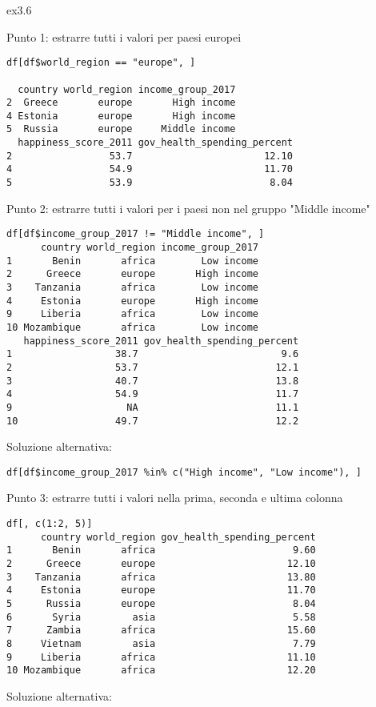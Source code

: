 \begin{solution}{ex3.6}

\noindent Punto 1: estrarre tutti i valori per paesi europei

\begin{lstlisting}[style=Rstyle]
df[df$world_region == "europe", ]

  country world_region income_group_2017
2  Greece       europe       High income
4 Estonia       europe       High income
5  Russia       europe     Middle income
  happiness_score_2011 gov_health_spending_percent
2                 53.7                       12.10
4                 54.9                       11.70
5                 53.9                        8.04
\end{lstlisting}
%
\noindent Punto 2: estrarre tutti i valori per i paesi non nel gruppo "Middle income"

\begin{lstlisting}[style=Rstyle]
df[df$income_group_2017 != "Middle income", ]
      country world_region income_group_2017
1       Benin       africa        Low income
2      Greece       europe       High income
3    Tanzania       africa        Low income
4     Estonia       europe       High income
9     Liberia       africa        Low income
10 Mozambique       africa        Low income
   happiness_score_2011 gov_health_spending_percent
1                  38.7                         9.6
2                  53.7                        12.1
3                  40.7                        13.8
4                  54.9                        11.7
9                    NA                        11.1
10                 49.7                        12.2
\end{lstlisting}
%
Soluzione alternativa:

\begin{lstlisting}[style=Rstyle]
df[df$income_group_2017 %in% c("High income", "Low income"), ]
\end{lstlisting}
%
\noindent Punto 3: estrarre tutti i valori nella prima, seconda e ultima colonna

\begin{lstlisting}[style=Rstyle]
df[, c(1:2, 5)]
      country world_region gov_health_spending_percent
1       Benin       africa                        9.60
2      Greece       europe                       12.10
3    Tanzania       africa                       13.80
4     Estonia       europe                       11.70
5      Russia       europe                        8.04
6       Syria         asia                        5.58
7      Zambia       africa                       15.60
8     Vietnam         asia                        7.79
9     Liberia       africa                       11.10
10 Mozambique       africa                       12.20
\end{lstlisting}
%
Soluzione alternativa:


\end{solution}
